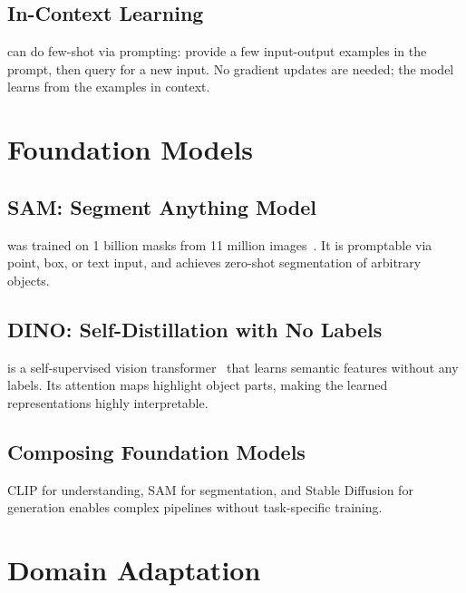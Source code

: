 \subsection{In-Context Learning}

 can do few-shot via prompting: provide a few input-output examples in the prompt, then query for a new input. No gradient updates are needed; the model learns from the examples in context.


\section{Foundation Models}


\subsection{SAM: Segment Anything Model}

 was trained on 1 billion masks from 11 million images~\cite{Kirillov2023SAM}. It is promptable via point, box, or text input, and achieves zero-shot segmentation of arbitrary objects.

\subsection{DINO: Self-Distillation with No Labels}

 is a self-supervised vision transformer~\cite{Caron2021DINO} that learns semantic features without any labels. Its attention maps highlight object parts, making the learned representations highly interpretable.

\subsection{Composing Foundation Models}

 CLIP for understanding, SAM for segmentation, and Stable Diffusion for generation enables complex pipelines without task-specific training.


\section{Domain Adaptation}

